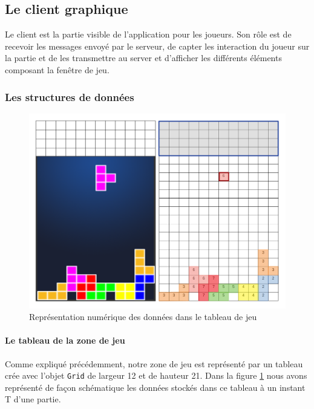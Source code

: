 \documentclass[a4paper, 12pt]{article}
\begin{document}
	\subsection{Le client graphique}

		Le client est la partie visible de l’application pour les joueurs. Son rôle est de recevoir les messages envoyé par le serveur, de capter les interaction du joueur sur la partie et de les transmettre au server et d’afficher les différents éléments composant la fenêtre de jeu.

		\subsubsection{Les structures de données}

			\begin{figure}[bt]
				\centering
				\includegraphics[scale=0.35]{img/grid.png}
				\caption{Représentation numérique des données dans le tableau de jeu}
				\label{fig:grid}
			\end{figure}

			\paragraph{Le tableau de la zone de jeu}

			Comme expliqué précédemment, notre zone de jeu est représenté par un tableau crée avec l’objet \texttt{Grid} de largeur 12 et de hauteur 21. Dans la figure \ref{fig:grid} nous avons représenté de façon schématique les données stockés dans ce tableau à un instant T d’une partie.
\end{document}
